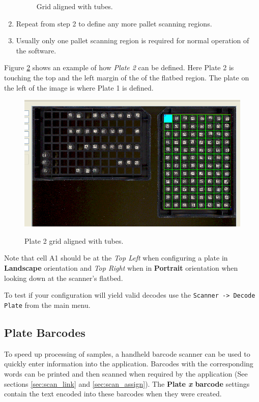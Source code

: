 \begin{enumerate}
\begin{figure}[H]
      \caption{Grid aligned with tubes.}
      \label{fig:plate1_grid_ready}
    \end{figure}
  \item Repeat from step 2 to define any more pallet scanning regions.
  \item Usually only one pallet scanning region is required for normal
    operation of the software.
\end{enumerate}
Figure \ref{fig:plate2_grid_ready} shows an example of how \emph{Plate 2} can
be defined. Here Plate 2 is touching the top and the left margin of
the of the flatbed region. The plate on the left of the image is where Plate 1
is defined.
    \begin{figure}[H]
      \centering
      \scalebox{0.5}
      { \includegraphics*{screenshots/configuration/plate2_grid_ready} }
      \caption{Plate 2 grid aligned with tubes.}
      \label{fig:plate2_grid_ready}
    \end{figure}
Note that cell A1 should be at the \emph{Top Left} when configuring a plate in
\textbf{Landscape} orientation and \emph{Top Right} when in \textbf{Portrait}
orientation when looking down at the scanner's flatbed.

To test if your configuration will yield valid decodes use the
\texttt{Scanner -> Decode Plate} from the main menu.
\subsection{Plate Barcodes}
To speed up processing of samples, a handheld barcode scanner can be used to
quickly enter information into the application. Barcodes with the corresponding
words can be printed and then scanned when required by the application (See
sections \ref{sec:scan_link} and \ref{sec:scan_assign}). The \textbf{Plate
  \emph{x} barcode} settings contain the text encoded into these barcodes when
they were created.

